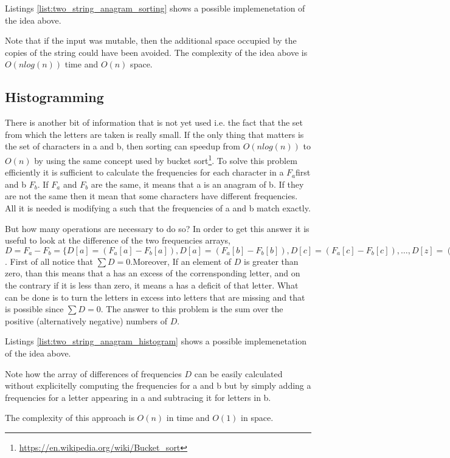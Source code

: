 Listings \ref{list:two_string_anagram_sorting} shows a possible implemenetation of the idea above. 


	


Note that if the input was mutable, then the additional space occupied by the copies of the string could have been avoided.
The complexity of the idea above is $O(n log(n))$ time and $O(n)$ space.

\subsection{Histogramming}
There is another bit of information that is not yet used i.e. the fact that the set from which the letters are taken is really small. 
If the only thing that matters is the set of characters in a and b, then sorting can speedup from $O(n log(n))$ to $O(n)$ by using the same concept used by bucket sort\footnote{\url{https://en.wikipedia.org/wiki/Bucket_sort}}.
To solve this problem efficiently it is sufficient  to calculate the frequencies for each character in a $F_a$first and b $F_b$. If $F_a$ and $F_b$ are the same, it means that a is an anagram of b. If they are not the same then it mean that some characters have different frequencies. All it is needed is modifying a such that the frequencies of a and b match exactly. 

But how many operations are necessary to do so?  In order to get this answer it is useful to look at the difference of the two frequencies arrays, $D = F_a - F_b = \{D[a] = (F_a[a] - F_b[a]), D[a] = (F_a[b] - F_b[b]), D[c] = (F_a[c] - F_b[c]), \ldots, D[z] = (F_a[z] - F_b[z])\}$. First of all notice that $\sum D = 0$.Moreover, If an element of $D$ is greater than zero, than this means that a has an excess of the corrensponding letter, and on the contrary if it is less than zero, it means a has a deficit of that letter. What can be done is to turn the letters in excess into letters that are missing and that is possible since $\sum D = 0$. 
The answer to this problem is the sum over the positive (alternatively negative) numbers of $D$. 

Listings \ref{list:two_string_anagram_histogram} shows a possible implemenetation of the idea above. 





Note how the array of differences of frequencies $D$ can be easily calculated without explicitelly computing the frequencies for a and b but by simply adding a frequencies for a letter appearing in a and subtracing it for letters in b. 

The complexity of this approach is $O(n)$ in time and $O(1)$ in space. 